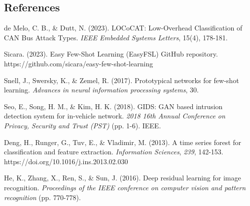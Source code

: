 \subsection{References}
\label{subsec:references}


\begin{thebibliography}{9}

de Melo, C. B., \& Dutt, N. (2023). LOCoCAT: Low-Overhead Classification of CAN Bus Attack Types. \textit{IEEE Embedded Systems Letters}, 15(4), 178-181.

Sicara. (2023). Easy Few-Shot Learning (EasyFSL) GitHub repository. https://github.com/sicara/easy-few-shot-learning

Snell, J., Swersky, K., \& Zemel, R. (2017). Prototypical networks for few-shot learning. \textit{Advances in neural information processing systems}, 30.

Seo, E., Song, H. M., \& Kim, H. K. (2018). GIDS: GAN based intrusion detection system for in-vehicle network. \textit{2018 16th Annual Conference on Privacy, Security and Trust (PST)} (pp. 1-6). IEEE.

Deng, H., Runger, G., Tuv, E., \& Vladimir, M. (2013). A time series forest for classification and feature extraction. \textit{Information Sciences}, \textit{239}, 142-153. https://doi.org/10.1016/j.ins.2013.02.030

He, K., Zhang, X., Ren, S., \& Sun, J. (2016). Deep residual learning for image recognition. \textit{Proceedings of the IEEE conference on computer vision and pattern recognition} (pp. 770-778).

\end{thebibliography}